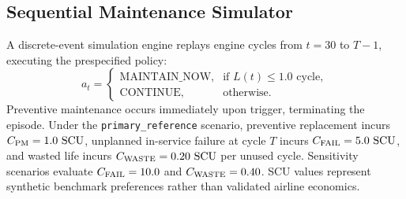 \subsection{Sequential Maintenance Simulator}
A discrete-event simulation engine replays engine cycles from $t=30$ to $T-1$, executing the prespecified policy:
\begin{equation}
a_t = \begin{cases} \text{MAINTAIN\_NOW}, & \text{if } L(t) \le 1.0 \text{ cycle}, \\ \text{CONTINUE}, & \text{otherwise.} \end{cases}
\end{equation}
Preventive maintenance occurs immediately upon trigger, terminating the episode. Under the \texttt{primary\_reference} scenario, preventive replacement incurs $C_{\text{PM}} = 1.0~\text{SCU}$, unplanned in-service failure at cycle $T$ incurs $C_{\text{FAIL}} = 5.0~\text{SCU}$, and wasted life incurs $C_{\text{WASTE}} = 0.20~\text{SCU}$ per unused cycle. Sensitivity scenarios evaluate $C_{\text{FAIL}} = 10.0$ and $C_{\text{WASTE}} = 0.40$. SCU values represent synthetic benchmark preferences rather than validated airline economics.

